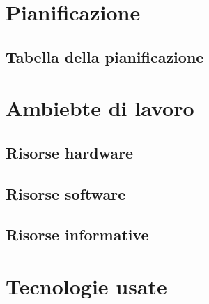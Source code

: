 \section{Pianificazione}
\subsection{Tabella della pianificazione}

\section{Ambiebte di lavoro}
\subsection{Risorse hardware}
\subsection{Risorse software}
\subsection{Risorse informative}

\section{Tecnologie usate}